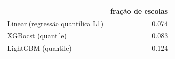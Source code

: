 \begin{tabular}{lr}
\toprule
 & fração de escolas \\
\midrule
Linear (regressão quantílica L1) & 0.074 \\
XGBoost (quantile) & 0.083 \\
LightGBM (quantile) & 0.124 \\
\bottomrule
\end{tabular}
